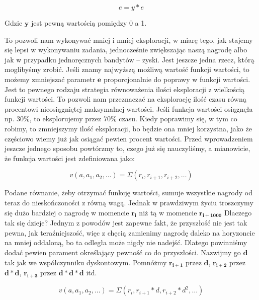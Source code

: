 \begin{equation}
e = y * e
\end{equation}

\noindent Gdzie $\boldsymbol{y}$ jest pewną wartością pomiędzy 0 a 1.\newline

To pozwoli nam wykonywać mniej i mniej eksploracji, w miarę tego, jak stajemy się lepsi w wykonywaniu zadania, jednocześnie zwiększając naszą nagrodę albo jak w przypadku jednoręcznych bandytów – zyski. Jest jeszcze jedna rzecz, którą moglibyśmy zrobić. Jeśli znamy najwyższą możliwą wartość funkcji wartości, to możemy zmniejszać parametr $\boldsymbol{e}$ proporcjonalnie do poprawy w funkcji wartości. Jest to pewnego rodzaju strategia równoważenia ilości eksploracji z wielkością funkcji wartości. To pozwoli nam przeznaczać na eksplorację ilość czasu równą procentowi nieosiągniętej maksymalnej wartości. Jeśli funkcja wartości osiągnęła np. 30\%, to eksplorujemy przez 70\% czasu. Kiedy poprawimy się, w tym co robimy, to zmniejszymy ilość eksploracji, bo będzie ona mniej korzystna, jako że częściowo wiemy już jak osiągać pewien procent wartości. Przed wprowadzeniem jeszcze jednego sposobu powtórzmy to, czego już się nauczyliśmy, a mianowicie, że funkcja wartości jest zdefiniowana jako:

\begin{equation}
v(a, a_1, a_2, ...) = \Sigma(r_i, r_{i+1}, r_{i+2}, …)
\end{equation}

\noindent Podane równanie, żeby otrzymać funkcję wartości, sumuje wszystkie nagrody od teraz do nieskończoności z równą wagą. Jednak w prawdziwym życiu troszczymy się dużo bardziej o nagrodę w momencie $\boldsymbol{r_i}$ niż tą w momencie $\boldsymbol{r_{i+1000}}$ Dlaczego tak się dzieje? Jednym z powodów jest zapewne fakt, że przyszłość nie jest tak pewna, jak teraźniejszość, więc z chęcią zamienimy nagrodę daleko na horyzoncie na mniej oddaloną, bo ta odległa może nigdy nie nadejść. Dlatego powinniśmy dodać pewien parament określający pewność co do przyszłości. Nazwijmy go $\boldsymbol{d}$ tak jak we współczynniku dyskontowym. Pomnóżmy $\boldsymbol{r_{i+1}}$ przez $\boldsymbol{d}$, $\boldsymbol{r_{i+2}}$ przez $\boldsymbol{d * d}$, $\boldsymbol{r_{i+3}}$ przez $\boldsymbol{d * d * d}$ itd.

\begin{equation}
v(a, a_1, a_2, ...) = \Sigma(r_i, r_{i+1} * d, r_{i+2} * d^2, …)
\end{equation}

